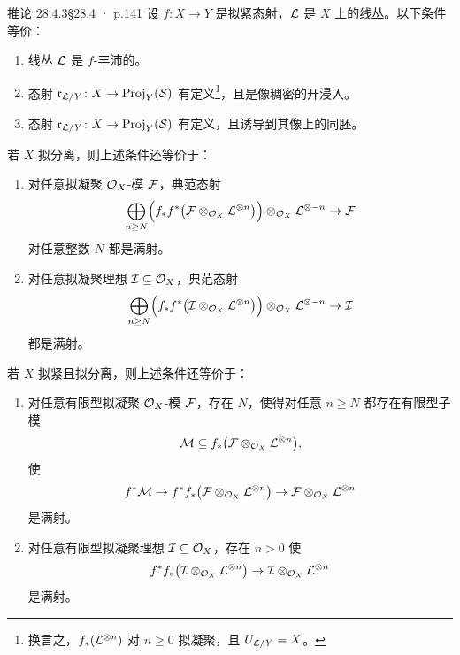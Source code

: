\documentclass[UTF8,10pt,fontset=windows]{ctexart}
\newcommand{\Proj}{\operatorname{Proj}}\newcommand{\Spv}{\operatorname{Spv}}
\begin{document}
\begin{card}{推论 28.4.3}{§28.4 · p.141}
设 $f\colon X\to Y$ 是拟紧态射，$\mathcal{L}$ 是 $X$ 上的线丛。以下条件等价：
\begin{enumerate}[label=(\alph*),leftmargin=2.6em,itemsep=0.3ex]
  \item 线丛 $\mathcal{L}$ 是 $f$-丰沛的。
  \item 态射 $\mathfrak r_{\cL/Y}\colon X\to\Proj_Y(\mathcal S)$ 有定义\footnote{换言之，$f_*(\mathcal{L}^{\otimes n})$ 对 $n\ge 0$ 拟凝聚，且 $U_{\mathcal{L}/Y}=X$。}，且是像稠密的开浸入。
  \item[\textup{(b')}] 态射 $\mathfrak r_{\cL/Y}\colon X\to\Proj_Y(\mathcal S)$ 有定义，且诱导到其像上的同胚。
\end{enumerate}
若 $X$ 拟分离，则上述条件还等价于：
\begin{enumerate}[label=(\alph*),leftmargin=2.6em,itemsep=0.3ex,start=3]
  \item 对任意拟凝聚 $\mathcal{O}_X$-模 $\mathcal{F}$，典范态射
  \[
  \bigoplus_{n\ge N}\Bigl(f_*f^*\bigl(\mathcal{F}\otimes_{\mathcal{O}_X}\mathcal{L}^{\otimes n}\bigr)\Bigr)\otimes_{\mathcal{O}_X}\mathcal{L}^{\otimes -n} \to \mathcal{F}
  \]
  对任意整数 $N$ 都是满射。
  \item[\textup{(c')}] 对任意拟凝聚理想 $\mathcal{I}\subseteq\mathcal{O}_X$，典范态射
  \[
  \bigoplus_{n\ge N}\Bigl(f_*f^*\bigl(\mathcal{I}\otimes_{\mathcal{O}_X}\mathcal{L}^{\otimes n}\bigr)\Bigr)\otimes_{\mathcal{O}_X}\mathcal{L}^{\otimes -n} \to \mathcal{I}
  \]
  都是满射。
\end{enumerate}
若 $X$ 拟紧且拟分离，则上述条件还等价于：
\begin{enumerate}[label=(\alph*),leftmargin=2.6em,itemsep=0.3ex,start=5]
  \item[\textup{(d)}] 对任意有限型拟凝聚 $\mathcal{O}_X$-模 $\mathcal{F}$，存在 $N$，使得对任意 $n\ge N$ 都存在有限型子模
  \[
  \mathcal{M}\subseteq f_*\bigl(\mathcal{F}\otimes_{\mathcal{O}_X}\mathcal{L}^{\otimes n}\bigr),
  \]
  使
  \[
  f^*\mathcal{M} \to f^*f_*\bigl(\mathcal{F}\otimes_{\mathcal{O}_X}\mathcal{L}^{\otimes n}\bigr) \to \mathcal{F}\otimes_{\mathcal{O}_X}\mathcal{L}^{\otimes n}
  \]
  是满射。
  \item[\textup{(d')}] 对任意有限型拟凝聚理想 $\mathcal{I}\subseteq\mathcal{O}_X$，存在 $n>0$ 使
  \[
  f^*f_*\bigl(\mathcal{I}\otimes_{\mathcal{O}_X}\mathcal{L}^{\otimes n}\bigr) \to \mathcal{I}\otimes_{\mathcal{O}_X}\mathcal{L}^{\otimes n}
  \]
  是满射。
\end{enumerate}
\end{card}
\end{document}
